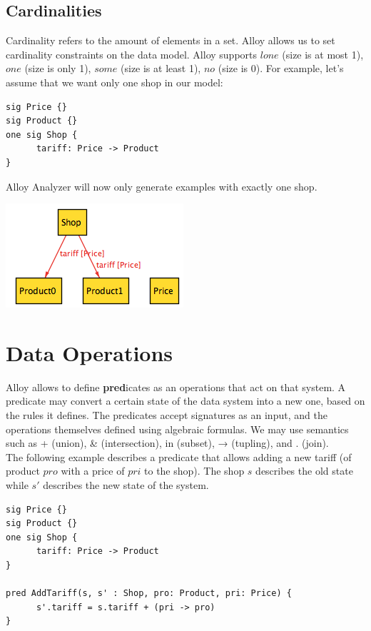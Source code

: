 \documentclass[oneside]{book}
\begin{document}
\subsection{Cardinalities}

Cardinality refers to the amount of elements in a set. Alloy allows us to set cardinality constraints on the data model. Alloy supports $lone$ (size is at most 1), $one$ (size is only 1), $some$ (size is at least 1), $no$ (size is 0). For example, let's assume that we want only one shop in our model:

\begin{lstlisting}
sig Price {}
sig Product {}
one sig Shop {
	  tariff: Price -> Product
}
\end{lstlisting}

Alloy Analyzer will now only generate examples with exactly one shop. 

\begin{center}
\includegraphics[scale=0.6]{shop2}
\end{center}

\section{Data Operations}
Alloy allows to define \textbf{pred}icates as an operations that act on that system. A predicate may convert a certain state of the data system into a new one, based on the rules it defines. The predicates accept signatures as an input, and the operations themselves defined using algebraic formulas. We may use semantics such as + (union), \& (intersection), in (subset), → (tupling), and . (join).\\

The following example describes a predicate that allows adding a new tariff (of product $pro$ with a price of $pri$ to the shop). The shop $s$ describes the old state while $s'$ describes the new state of the system.

\begin{lstlisting}
sig Price {}
sig Product {}
one sig Shop {
	  tariff: Price -> Product
}

pred AddTariff(s, s' : Shop, pro: Product, pri: Price) {
	  s'.tariff = s.tariff + (pri -> pro)
}
\end{lstlisting}
\end{document}
